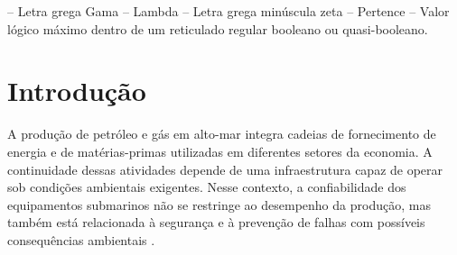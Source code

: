 \documentclass[arial,centeredequations,english,brazilian,oneside,section=TITLE]{ifes8}
\begin{document}
\begin{simbolos}
  \simb{$\Gamma$} -- Letra grega Gama
  \simb{$\Lambda$} -- Lambda
  \simb{$\zeta$} -- Letra grega minúscula zeta
  \simb{$\in$} -- Pertence
  \simb{$\top$} -- Valor lógico máximo dentro de um reticulado regular booleano ou quasi-booleano.
\end{simbolos}
\cleardoublepage


\imprimirsumario
\cleardoublepage


\textual


\setlength{\afterchapskip}{0\baselineskip}

\chapter{Introdução}
\label{cha:introducao}

A produção de petróleo e gás em alto-mar integra cadeias de fornecimento de energia e de matérias-primas 
utilizadas em diferentes setores da economia. A continuidade dessas atividades depende de uma infraestrutura
capaz de operar sob condições ambientais exigentes. Nesse contexto, a confiabilidade dos equipamentos submarinos
não se restringe ao desempenho da produção, mas também está relacionada à segurança e à prevenção de falhas com
possíveis consequências ambientais \cite{ANP2023}.

\end{document}
